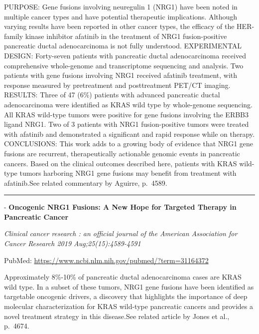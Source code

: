 \documentclass[]{article}
\begin{document}
PURPOSE: Gene fusions involving neuregulin 1 (NRG1) have been noted in
multiple cancer types and have potential therapeutic implications.
Although varying results have been reported in other cancer types, the
efficacy of the HER-family kinase inhibitor afatinib in the treatment of
NRG1 fusion-positive pancreatic ductal adenocarcinoma is not fully
understood. EXPERIMENTAL DESIGN: Forty-seven patients with pancreatic
ductal adenocarcinoma received comprehensive whole-genome and
transcriptome sequencing and analysis. Two patients with gene fusions
involving NRG1 received afatinib treatment, with response measured by
pretreatment and posttreatment PET/CT imaging. RESULTS: Three of 47
(6\%) patients with advanced pancreatic ductal adenocarcinoma were
identified as KRAS wild type by whole-genome sequencing. All KRAS
wild-type tumors were positive for gene fusions involving the ERBB3
ligand NRG1. Two of 3 patients with NRG1 fusion-positive tumors were
treated with afatinib and demonstrated a significant and rapid response
while on therapy. CONCLUSIONS: This work adds to a growing body of
evidence that NRG1 gene fusions are recurrent, therapeutically
actionable genomic events in pancreatic cancers. Based on the clinical
outcomes described here, patients with KRAS wild-type tumors harboring
NRG1 gene fusions may benefit from treatment with afatinib.See related
commentary by Aguirre, p.~4589.

{}

{}

\begin{center}\rule{0.5\linewidth}{\linethickness}\end{center}

 - \textbf{Oncogenic NRG1 Fusions: A New Hope for Targeted Therapy in
Pancreatic Cancer}

\emph{Clinical cancer research : an official journal of the American
Association for Cancer Research 2019 Aug;25(15):4589-4591}

PubMed: \url{https://www.ncbi.nlm.nih.gov/pubmed/?term=31164372}

Approximately 8\%-10\% of pancreatic ductal adenocarcinoma cases are
KRAS wild type. In a subset of these tumors, NRG1 gene fusions have been
identified as targetable oncogenic drivers, a discovery that highlights
the importance of deep molecular characterization for KRAS wild-type
pancreatic cancers and provides a novel treatment strategy in this
disease.See related article by Jones et al., p.~4674.

{}
\end{document}
